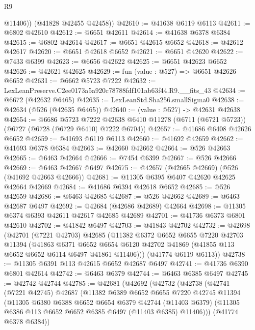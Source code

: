 \begin{lexlean}{R9}
\begin{coremodule}
          @11406))
      (@41828 @42455 @42458))
@42610 := @41638 @6119 @6113
@42611 := @6802 @42610
@42612 := @6651 @42611
@42614 := @41638 @6378 @6384
@42615 := @6802 @42614
@42617 := @6651 @42615 @6652
@42618 := @42612 @42617
@42620 := @6651 @42618 @6652
@42621 := @6651 @42620
@42622 := @7433 @6399
@42623 := @6656 @42622
@42625 := @6651 @42623 @6652
@42626 := @42621 @42625
@42629 := fun (value : @527) => @6651 @42626 @6652
@42631 := @6662 @5723 @7222
@42632 := LexLeanPreserve.C2ee0173a5a920c78788fdf101ab63f44.R9.__fits_43
@42634 := @6672 (@42632 @6465)
@42635 := LexLeanStd.Sha256.smallSigma0
@42638 := @42634 (@526 (@42635 @6465))
@42640 := (value : @527) -> @42631 @42638
@42654 := @6686
    @5723
    @7222
    @42638
    @6410
    @11278
    (@6711 (@6721 @5723))
    (@6727 (@6728 (@6729 @6410) @7222 @6704))
@42657 := @41686 @6408 @42626 @6652
@42659 := @41693 @6119 @6113
@42660 := @41692 @42659
@42662 := @41693 @6378 @6384
@42663 := @42660 @42662
@42664 := @526 @42663
@42665 := @6463 @42664
@42666 := @7454 @6399
@42667 := @526 @42666
@42669 := @6463 @42667 @6497
@42675 := @42657 (@42665 @42669) (@526 (@41692 @42663 @42666))
@42681 := @11305 @6395 @6407 @42620 @42625 @42664 @42669
@42684 := @41686 @6394 @42618 @6652
@42685 := @526 @42659
@42686 := @6463 @42685
@42687 := @526 @42662
@42689 := @6463 @42687 @6497
@42692 := @42684 (@42686 @42689) @42664
@42698 := @11305 @6374 @6393 @42611 @42617 @42685 @42689
@42701 := @41736 @6373 @6801 @42610
@42702 := @41842 @6497
@42703 := @41843 @42702
@42732 := @42698
    (@42701
      (@7221 @42703)
      @42685
      (@11382
        @6372
        @6652
        @6655
        @7220
        @42703
        @11394
        (@41863
          @6371
          @6652
          @6654
          @6120
          @42702
          @41869
          (@41855 @113 @6652 @6652 @6114 @6497 @41861 @11406)))
      (@41774 @6119 @6113))
@42738 := @11305 @6391 @113 @42615 @6652 @42687 @6497
@42741 := @41736 @6390 @6801 @42614
@42742 := @6463 @6379
@42744 := @6463 @6385 @6497
@42745 := @42742 @42744
@42785 := @42681
    (@42692
      (@42732
        (@42738
          (@42741
            (@7221 @42745)
            @42687
            (@11382
              @6389
              @6652
              @6655
              @7220
              @42745
              @11394
              (@11305
                @6380
                @6388
                @6652
                @6654
                @6379
                @42744
                (@11403 @6379)
                (@11305 @6386 @113 @6652 @6652 @6385 @6497 (@11403 @6385) @11406)))
            (@41774 @6378 @6384))

\end{coremodule}
\end{lexlean}
